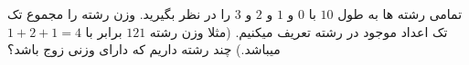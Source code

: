 \exercise
تمامی رشته ها به طول 
$10$
با 
$0$
 و 
$1$
  و 
$2$
   و 
$3$
    را در نظر بگیرید. وزن رشته را مجموع تک تک اعداد موجود در رشته تعریف میکنیم. (مثلا وزن رشته 
$121$
     برابر با 
$1 + 2 + 1 = 4$
میباشد.) چند رشته داریم که دارای وزنی زوج باشد؟